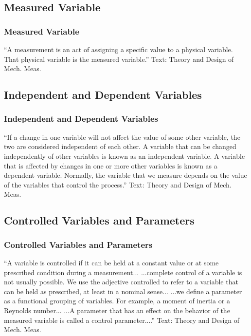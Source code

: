 \documentclass[fleqn]{beamer} %
\newcommand{\sectionIIsubsectionItitle}{Measured Variable}
\newcommand{\sectionIIsubsectionIItitle}{Independent and Dependent Variables}
\newcommand{\sectionIIsubsectionIIItitle}{Controlled Variables and Parameters}
\begin{document}
		\subsection{\sectionIIsubsectionItitle}\label{sectionIIsubsectionI}

			\begin{frame}[label=sectionIIsubsectionI]
				\frametitle{\sectionIIsubsectionItitle}

				\large{``A {\BL measurement} is an act of assigning a specific value to a physical variable. That physical variable
				is the {\GR measured variable}.''} \vspc
				{\tiny Text: Theory and Design of Mech. Meas.}

			\end{frame}

		\subsection{\sectionIIsubsectionIItitle}\label{sectionIIsubsectionII}

			\begin{frame}
				\frametitle{\sectionIIsubsectionIItitle}

				{``If a change in one variable will not affect the value of some other variable, the
				two are considered independent of each other. A variable that can be changed independently of other
				variables is known as an {\PR independent variable}. A variable that is affected by changes in one or more
				other variables is known as a {\BR dependent variable}. Normally, the variable that we measure depends on
				the value of the variables that control the process.''} \vspc
				{\tiny Text: Theory and Design of Mech. Meas.}

			\end{frame}

		\subsection{\sectionIIsubsectionIIItitle}\label{sectionIIsubsectionIII}

			\begin{frame}
				\frametitle{\sectionIIsubsectionIIItitle}

				{``A variable is {\BL controlled} if it can be held at a constant value
				or at some prescribed condition during a measurement... ...complete control of a variable is not usually
				possible. We use the adjective {\BL controlled} to refer to a variable that can be held as prescribed, at
				least in a nominal sense... \vspc
				...we define a {\GR parameter} as a functional grouping of variables. For example, a moment of inertia or a Reynolds number... ...A {\GR parameter} that has an effect on the behavior of the measured variable is called a control parameter....''} \vspc
				{\tiny Text: Theory and Design of Mech. Meas.}

			\end{frame}
\end{document}

